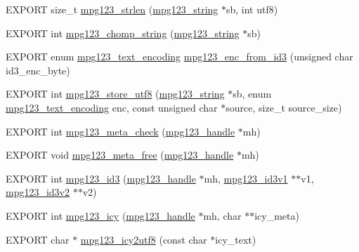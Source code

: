 \begin{DoxyCompactItemize}
\item 
E\+X\+P\+O\+RT size\+\_\+t \hyperlink{group__mpg123__metadata_ga70b5cae190d2e906ab1c3b5a35f14ef1}{mpg123\+\_\+strlen} (\hyperlink{structmpg123__string}{mpg123\+\_\+string} $\ast$sb, int utf8)
\item 
E\+X\+P\+O\+RT int \hyperlink{group__mpg123__metadata_ga8b85a7dc7b0407eb656d3f702e74e7ae}{mpg123\+\_\+chomp\+\_\+string} (\hyperlink{structmpg123__string}{mpg123\+\_\+string} $\ast$sb)
\item 
E\+X\+P\+O\+RT enum \hyperlink{group__mpg123__metadata_ga489b4cd5fb8d1d826e38b09bed9294ce}{mpg123\+\_\+text\+\_\+encoding} \hyperlink{group__mpg123__metadata_gaa7f088a7bcb3063b005e45d8c0e428ed}{mpg123\+\_\+enc\+\_\+from\+\_\+id3} (unsigned char id3\+\_\+enc\+\_\+byte)
\item 
E\+X\+P\+O\+RT int \hyperlink{group__mpg123__metadata_gad4253518f7d56823d46ad365d272fa85}{mpg123\+\_\+store\+\_\+utf8} (\hyperlink{structmpg123__string}{mpg123\+\_\+string} $\ast$sb, enum \hyperlink{group__mpg123__metadata_ga489b4cd5fb8d1d826e38b09bed9294ce}{mpg123\+\_\+text\+\_\+encoding} enc, const unsigned char $\ast$source, size\+\_\+t source\+\_\+size)
\item 
E\+X\+P\+O\+RT int \hyperlink{group__mpg123__metadata_gad1df8bdc0bf70197a668e11819f260d2}{mpg123\+\_\+meta\+\_\+check} (\hyperlink{group__mpg123__init_ga6728e2839a395f3a07d4514da659faca}{mpg123\+\_\+handle} $\ast$mh)
\item 
E\+X\+P\+O\+RT void \hyperlink{group__mpg123__metadata_ga4661443ff7cf899309bcf0b737873921}{mpg123\+\_\+meta\+\_\+free} (\hyperlink{group__mpg123__init_ga6728e2839a395f3a07d4514da659faca}{mpg123\+\_\+handle} $\ast$mh)
\item 
E\+X\+P\+O\+RT int \hyperlink{group__mpg123__metadata_ga2fa5ec6785ff317624fe53459538043d}{mpg123\+\_\+id3} (\hyperlink{group__mpg123__init_ga6728e2839a395f3a07d4514da659faca}{mpg123\+\_\+handle} $\ast$mh, \hyperlink{structmpg123__id3v1}{mpg123\+\_\+id3v1} $\ast$$\ast$v1, \hyperlink{structmpg123__id3v2}{mpg123\+\_\+id3v2} $\ast$$\ast$v2)
\item 
E\+X\+P\+O\+RT int \hyperlink{group__mpg123__metadata_ga4c5933e4b03a7c5eefc7802734d32bef}{mpg123\+\_\+icy} (\hyperlink{group__mpg123__init_ga6728e2839a395f3a07d4514da659faca}{mpg123\+\_\+handle} $\ast$mh, char $\ast$$\ast$icy\+\_\+meta)
\item 
E\+X\+P\+O\+RT char $\ast$ \hyperlink{group__mpg123__metadata_gabcd631e74cb00a3be41b5539f0631faf}{mpg123\+\_\+icy2utf8} (const char $\ast$icy\+\_\+text)
\end{DoxyCompactItemize}


